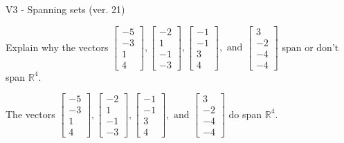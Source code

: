 \begin{exercise}
  \begin{exerciseTitle}V3 - Spanning sets (ver. 21)\end{exerciseTitle}
  \begin{exerciseStatement}
    Explain why the vectors \(\left[\begin{array}{r}
-5 \\
-3 \\
1 \\
4
\end{array}\right] , \left[\begin{array}{r}
-2 \\
1 \\
-1 \\
-3
\end{array}\right] , \left[\begin{array}{r}
-1 \\
-1 \\
3 \\
4
\end{array}\right] , \text{ and } \left[\begin{array}{r}
3 \\
-2 \\
-4 \\
-4
\end{array}\right]\) span or don't span \(\mathbb{R}^4\). 
	


  \end{exerciseStatement}
  \begin{exerciseAnswer}
   The vectors \(\left[\begin{array}{r}
-5 \\
-3 \\
1 \\
4
\end{array}\right] , \left[\begin{array}{r}
-2 \\
1 \\
-1 \\
-3
\end{array}\right] , \left[\begin{array}{r}
-1 \\
-1 \\
3 \\
4
\end{array}\right] , \text{ and } \left[\begin{array}{r}
3 \\
-2 \\
-4 \\
-4
\end{array}\right]\) 
  	 do  
	span \(\mathbb{R}^4\).
  


  \end{exerciseAnswer}
\end{exercise}